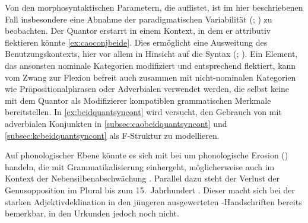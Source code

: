 Von den morphosyntaktischen Parametern, die \citet[174]{lehmann2015} auflistet,
ist im hier beschriebenen Fall insbesondere eine Abnahme der paradigmatischen
Variabilität (; \cite[146--150]{lehmann2015}) zu
beobachten. Der Quantor erstarrt in einem Kontext, in dem er attributiv
flektieren könnte \cref{ex:caoconjbeide}. Dies ermöglicht eine Ausweitung des
Benutzungskontexts, hier vor allem in Hinsicht auf die Syntax (; \cite[150--151]{lehmann2015}). Ein Element, das
ansonsten nominale Kategorien modifiziert und entsprechend flektiert, kann vom
Zwang zur Flexion befreit auch zusammen mit nicht-nominalen Kategorien wie
Präpositionalphrasen oder Adverbialen verwendet werden, die selbst keine mit
dem Quantor als Modifizierer kompatiblen grammatischen Merkmale bereitstellen.
In \cref{ex:beidquantsyncont} wird versucht, den Gebrauch von  mit
adverbialen Konjunkten in \cref{subsec:caobeidquantsyncont} und
\ref{subsec:kcbeidquantsyncont} als F-Struktur zu modellieren.

Auf phonologischer Ebene könnte es sich mit \citet[134--136]{lehmann2015} bei
 um phonologische Erosion () handeln,
die mit Grammatikalisierung einhergeht, möglicherweise auch im Kontext der
Nebensilbenabschwächung \autocite[88--92]{braune2018}. Parallel dazu steht der
Verlust der Genusopposition im Plural bis zum 15.~Jahrhundert
\autocites[203]{paul2007}[191--192]{reichmannwegera1993}. Dieser macht sich bei der
starken Adjektivdeklination in den jüngeren ausgewerteten
\KC{}-Handschriften bereits bemerkbar, in den Urkunden jedoch noch
nicht.

